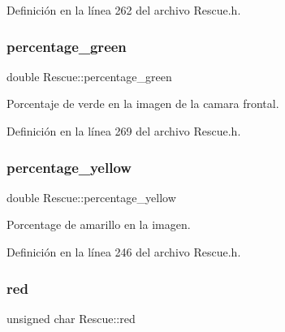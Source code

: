 Definición en la línea 262 del archivo Rescue.\+h.

\mbox{\label{classRescue_a37191f058e32b0d1e8c184cfbf6daf5f_a37191f058e32b0d1e8c184cfbf6daf5f}} 
\subsubsection{\texorpdfstring{percentage\+\_\+green}{percentage\_green}}
{\footnotesize\ttfamily double Rescue\+::percentage\+\_\+green\hspace{0.3cm}{\ttfamily [private]}}



Porcentaje de verde en la imagen de la camara frontal. 



Definición en la línea 269 del archivo Rescue.\+h.

\mbox{\label{classRescue_ad0101336342f1b5e9753b692d0d8b484_ad0101336342f1b5e9753b692d0d8b484}} 
\subsubsection{\texorpdfstring{percentage\+\_\+yellow}{percentage\_yellow}}
{\footnotesize\ttfamily double Rescue\+::percentage\+\_\+yellow\hspace{0.3cm}{\ttfamily [private]}}



Porcentage de amarillo en la imagen. 



Definición en la línea 246 del archivo Rescue.\+h.

\mbox{\label{classRescue_af9ba54390762489e7f5c13ea8623b745_af9ba54390762489e7f5c13ea8623b745}} 
\subsubsection{\texorpdfstring{red}{red}}
{\footnotesize\ttfamily unsigned char Rescue\+::red\hspace{0.3cm}{\ttfamily [private]}}



